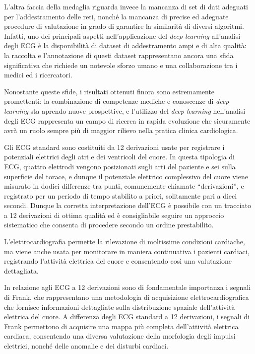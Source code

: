 \documentclass[12pt,italian]{report}
\begin{document}
	L'altra faccia della medaglia riguarda invece la mancanza di set di dati adeguati per l'addestramento delle reti, nonché la mancanza di precise ed adeguate procedure di valutazione in grado di garantire la similarità di diversi algoritmi. Infatti, uno dei principali aspetti nell'applicazione del \textit{deep learning} all'analisi degli ECG è la disponibilità di dataset di addestramento ampi e di alta qualità: la raccolta e l'annotazione di questi dataset rappresentano ancora una sfida significativa che richiede un notevole sforzo umano e una collaborazione tra i medici ed i ricercatori.
	
	Nonostante queste sfide, i risultati ottenuti finora sono estremamente promettenti: la combinazione di competenze mediche e conoscenze di \textit{deep learning} sta aprendo nuove prospettive, e l'utilizzo del \textit{deep learning} nell'analisi degli ECG rappresenta un campo di ricerca in rapida evoluzione che sicuramente avrà un ruolo sempre più di maggior rilievo nella pratica clinica cardiologica.
	
	Gli ECG standard sono costituiti da 12 derivazioni usate per registrare i potenziali elettrici degli atri e dei ventricoli del cuore. In questa tipologia di ECG, quattro elettrodi vengono posizionati sugli arti del paziente e sei sulla superficie del torace, e dunque il potenziale elettrico complessivo del cuore viene misurato in dodici differenze tra punti, comunemente chiamate ``derivazioni'', e registrato per un periodo di tempo stabilito a priori, solitamente pari a dieci secondi. Dunque la corretta interpretazione dell'ECG è possibile con un tracciato a 12 derivazioni di ottima qualità ed è consigliabile seguire un approccio sistematico che consenta di procedere secondo un ordine prestabilito.
	
	L'elettrocardiografia permette la rilevazione di moltissime condizioni cardiache, ma viene anche usata per monitorare in maniera continuativa i pazienti cardiaci, registrando l'attività elettrica del cuore e consentendo così una valutazione dettagliata.
	
	In relazione agli ECG a 12 derivazioni sono di fondamentale importanza i segnali di Frank, che rappresentano una metodologia di acquisizione elettrocardiografica che fornisce informazioni dettagliate sulla distribuzione spaziale dell'attività elettrica del cuore. A differenza degli ECG standard a 12 derivazioni, i segnali di Frank permettono di acquisire una mappa più completa dell'attività elettrica cardiaca, consentendo una diversa valutazione della morfologia degli impulsi elettrici, nonché delle anomalie e dei disturbi cardiaci.
	
\end{document}
